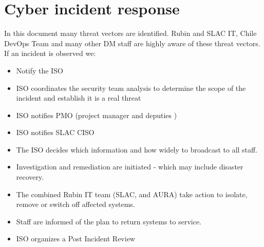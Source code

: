 \section{Cyber incident response}
In this document many threat vectors are identified.
Rubin and SLAC  IT, Chile DevOps Team and many other \gls{DM} staff are highly aware of these threat vectors.
If an incident is observed we:
\begin{itemize}
\item Notify the \gls{ISO} 
\item \gls{ISO} coordinates the security team analysis to determine the scope of the incident and establish it is a real threat
\item \gls{ISO} notifies \gls{PMO} (project manager and deputies )
\item \gls{ISO} notifies SLAC \gls{CISO}
\item The \gls{ISO} decides which information and  how widely to broadcast to all staff.
\item Investigation and remediation are initiated - which may include disaster recovery.
\item The combined Rubin \gls{IT} team (SLAC, and AURA)  take action to isolate, remove or  switch off affected systems.
\item Staff are informed of the plan to return systems to service.
\item \gls{ISO} organizes a Post Incident Review
\end{itemize}

